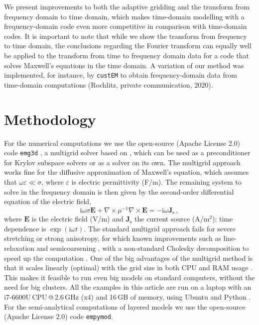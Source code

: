 \documentclass[extra, camera,%
    referee,     %
]{gji}
\newcommand{\emg}[2]{\texttt{emg#1#2}\xspace}
\newcommand{\empymod}{\texttt{empymod}\xspace}
\newcommand{\custem}{\texttt{custEM}\xspace}
\begin{document}
We present improvements to both the adaptive gridding and the transform from
frequency domain to time domain, which makes time-domain modelling with a
frequency-domain code even more competitive in comparison with time-domain
codes. It is important to note that while we show the transform from frequency
to time domain, the conclusions regarding the Fourier transform can equally
well be applied to the transform from time to frequency domain data for a code
that solves Maxwell's equations in the time domain. A variation of our method
was implemented, for instance, by \custem \citep{GEO.19.Rochlitz} to obtain
frequency-domain data from time-domain computations (Rochlitz, private
communication, 2020).


\section{Methodology} %

For the numerical computations we use the open-source (Apache License 2.0) code
\emg3d \citep{JOSS.19.Werthmuller}, a multigrid solver based on
\cite{GP.06.Mulder}, which can be used as a preconditioner for Krylov subspace
solvers or as a solver on its own. The multigrid approach works fine for the
diffusive approximation of Maxwell's equation, which assumes that
$\omega\varepsilon \ll \sigma$, where $\varepsilon$ is electric permittivity
(F/m). The remaining system to solve in the frequency domain is then given by
the second-order differential equation of the electric field,
%
\begin{equation}
    \mathrm{i}\omega\sigma \mathbf{E} +
    \nabla \times \mu^{-1} \nabla \times \mathbf{E}
    = -\mathrm{i}\omega\mathbf{J}_\mathrm{s} \, ,
  \label{eq:maxwell}
\end{equation}
%
where $\mathbf{E}$ is the electric field (V/m) and $\mathbf{J}_\mathrm{s}$ the
current source (A/m$^2$); time dependence is $\exp(\mathrm{i}\omega t)$. The
standard multigrid approach fails for severe stretching or strong anisotropy,
for which \deleted{\emg3d has implemented }known improvements such as
line-relaxation and semicoarsening \citep{ECCFD.06.Jonsthovel} , with a non-standard Cholesky decomposition to speed up the
computation \citep{GEO.08.Mulder}. One of the big advantages of the multigrid
method is that it scales linearly (optimal) with the grid size in both CPU and
RAM usage \citep{B.Springer.20.Mulder}. This makes it feasible to run even big
models on standard computers, without the need for big clusters. All the
examples in this article are run on a laptop with an i7-6600U\,CPU\,@\,2.6\,GHz
(x4) and 16\,GB of memory, using Ubuntu  and Python
.  For the semi-analytical
computations of layered models we use the open-source (Apache License 2.0) code
\empymod \citep{GEO.17.Werthmuller}.
\end{document}
